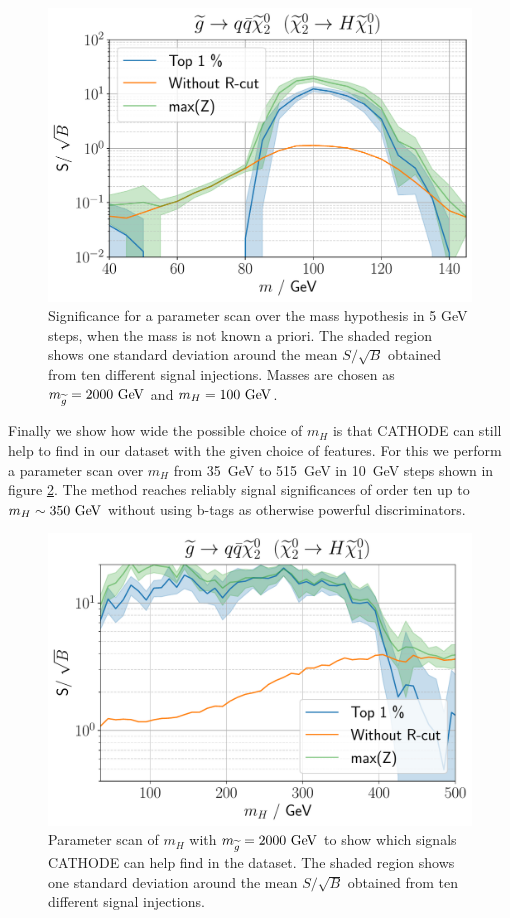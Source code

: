\documentclass[prd, twocolumn, superscriptaddress,floatfix, nofootinbib, preprintnumbers]{revtex4-2}
\begin{document}
\begin{figure}[t]
\centering
\includegraphics[width=0.9\linewidth]{2000GeV_MH100GeVMassWindow.pdf}
\caption{Significance for a parameter scan over the mass hypothesis in 5 GeV steps, when the mass is not known a priori. The shaded region shows one standard deviation around the mean $S/\sqrt{B}$ obtained from ten different signal injections. Masses are chosen as $m_{\widetilde{g}}=2000~{\rm GeV}$ and $m_H = 100~{\rm GeV}$.}
\label{fig:unknownMass}
\end{figure}

Finally we show how wide the possible choice of $m_H$ is that CATHODE can still help to find in our dataset with the given choice of features. For this we perform a parameter scan over $m_H$ from 35~GeV to 515~GeV in 10~GeV steps shown in figure \ref{fig:mhscan}. The method reaches reliably signal significances of order ten up to $m_H \sim 350~{\rm GeV}$ without using b-tags as otherwise powerful discriminators.

\begin{figure}[b]
\centering
\includegraphics[width=0.9\linewidth]{2000GeV_MH.pdf}
\caption{Parameter scan of $m_H$ with $m_{\widetilde{g}}=2000~{\rm GeV}$ to show which signals CATHODE can help find in the dataset. The shaded region shows one standard deviation around the mean $S/\sqrt{B}$ obtained from ten different signal injections. }
\label{fig:mhscan}
\end{figure}
\end{document}
